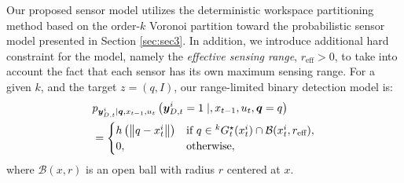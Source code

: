 \documentclass[letterpaper, 10 pt, conference]{ieeeconf}
\begin{document}
Our proposed sensor model utilizes the deterministic workspace partitioning method based on the order-$k$ Voronoi partition toward the probabilistic sensor model presented in Section \ref{sec:sec3}. 
In addition, we introduce additional hard constraint for the model, namely the \emph{effective sensing range}, $r_{\text{eff}} >0$, to take into account the fact that each sensor has its own maximum sensing range. 
For a given $k$, and the target $z = (q,I)$, our range-limited binary detection model is:
\begin{align}
&p_{\bm{y}_{D,t}^i \mid \bm{q},x_{t-1},u_t
}\left(\bm{y}_{D,t}^i = 1 \mid ,x_{t-1},u_t,\bm{q}=q
\right) \nonumber\\
&=\begin{cases}
h\left(\left\|q-x_t^i \right\|\right) & \textup{if }q \in {}^kG_t^{\star}(x_t^i)
\cap \mathcal{B}(x_t^i,r_{\text{eff}})
,\nonumber \\
0, & \textup{otherwise},
\end{cases}\nonumber 
\end{align}
where $\mathcal{B}(x,r)$ is an open ball with radius $r$ centered at $x$.
\end{document}
